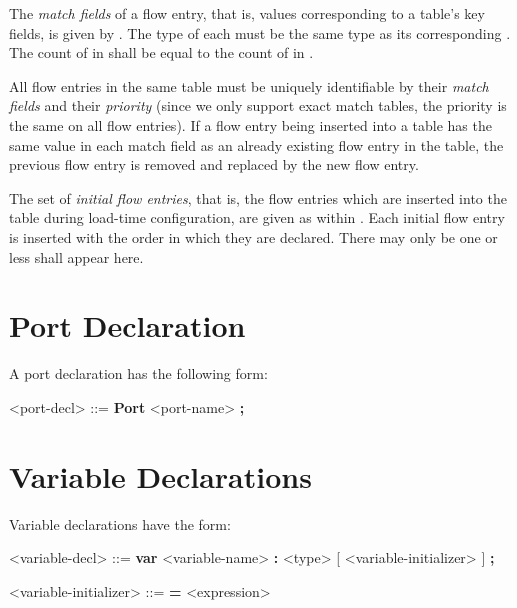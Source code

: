 The \textit{match fields} of a flow entry, that is, values corresponding to a table's key fields, is given by . The type of each  must be the same type as its corresponding . The count of  in  shall be equal to the count of  in .

All flow entries in the same table must be uniquely identifiable by their \textit{match fields} and their \textit{priority} (since we only support exact match tables, the priority is the same on all flow entries). If a flow entry being inserted into a table has the same value in each match field as an already existing flow entry in the table, the previous flow entry is removed and replaced by the new flow entry.

The set of \textit{initial flow entries}, that is, the flow entries which are inserted into the table during load-time configuration, are given as  within . Each initial flow entry is inserted with the order in which they are declared. There may only be one or less  shall appear here.

\section{Port Declaration} \label{port_guide}

A port declaration has the following form:

\begin{minip}
\begin{grammar}
<port-decl> ::=
\textbf{Port} <port-name> \textbf{;}

\end{grammar}
\end{minip}

\section{Variable Declarations} \label{variable_guide}

Variable declarations have the form:

\begin{minip}
\begin{grammar}
<variable-decl> ::=
\textbf{var} <variable-name> \textbf{:} <type> [ <variable-initializer> ] \textbf{;}

<variable-initializer> ::= \textbf{=} <expression>
\end{grammar}
\end{minip}

